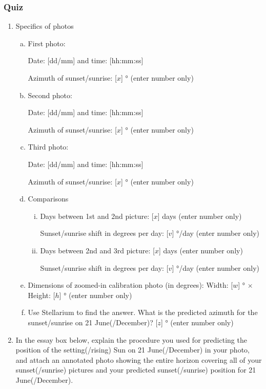 \documentclass[12pt]{article}
\begin{document}
\subsubsection {Quiz}
\begin{enumerate}
\item
Specifics of photos
\begin{enumerate}[a.]
    \item
    First photo:
    
    Date: [dd/mm] and time: [hh:mm:ss]
    
    Azimuth of sunset/sunrise: [$x$] \si{\degree} (enter number only)
    \item
    Second photo:
    
    Date: [dd/mm] and time: [hh:mm:ss]
    
    Azimuth of sunset/sunrise: [$x$] \si{\degree} (enter number only)
    \item
    Third photo:
    
    Date: [dd/mm] and time: [hh:mm:ss]
    
    Azimuth of sunset/sunrise: [$x$] \si{\degree} (enter number only)
    \item
    Comparisons
    \begin{enumerate}[i.]
        \item
        Days between 1st and 2nd picture: [$x$] days (enter number only)
        
        Sunset/sunrise shift in degrees per day: [$v$] \si{\degree}/day (enter number only)
        \item
        Days between 2nd and 3rd picture: [$x$] days (enter number only)
        
        Sunset/sunrise shift in degrees per day: [$v$] \si{\degree}/day (enter number only)
    \end{enumerate}
    \item
    Dimensions of zoomed-in calibration photo (in degrees): Width: [$w$] \si{\degree} $\times$ Height: [$h$] \si{\degree} (enter number only)
    \item
    Use Stellarium to find the answer. What is the predicted azimuth for the sunset/sunrise on 21 June(/December)? [$z$] \si{\degree} (enter number only)
\end{enumerate}
 
\item
In the essay box below, explain the procedure you used for predicting the position of the setting(/rising) Sun on 21 June(/December) in your photo, and attach an annotated photo showing the entire horizon covering all of your sunset(/sunrise) pictures and your predicted sunset(/sunrise) position for 21 June(/December).


\end{enumerate}
\end{document}
